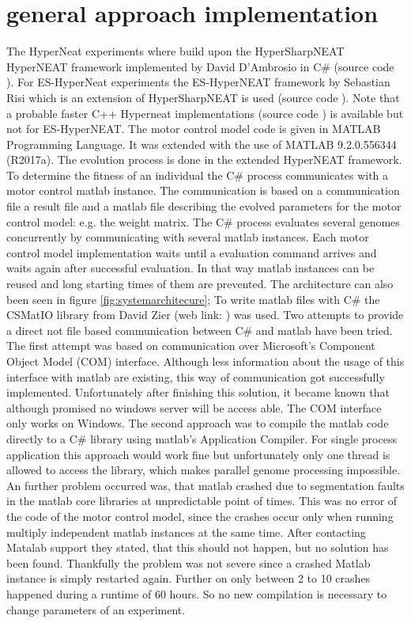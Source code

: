 \section{general approach implementation}
The HyperNeat experiments where build upon the HyperSharpNEAT HyperNEAT framework implemented by David D'Ambrosio in C\# (source code \cite{HyperneatLink}). For ES-HyperNeat experiments the ES-HyperNEAT framework by Sebastian Risi which is an extension of HyperSharpNEAT is used (source code \cite{ES-HyperneatLink}). Note that a probable faster C++ Hyperneat implementations (source code \cite{HyperneatLinkC++}) is available but not for ES-HyperNEAT. The motor control model code is given in MATLAB Programming Language. It was extended with the use of  MATLAB 9.2.0.556344 (R2017a). 
The evolution process is done in the extended HyperNEAT framework. To determine the fitness of an individual the C\# process communicates with a motor control matlab instance.  The communication is based on a communication file a result file and a matlab file describing the evolved parameters for the motor control model: e.g. the weight matrix.  The C\# process evaluates several genomes concurrently by communicating with several matlab instances. Each motor control model implementation waits until a evaluation command arrives and waits again after successful evaluation. In that way matlab instances can be reused and long starting times of them are prevented. The architecture can also been seen in figure \ref{fig:systemarchitecure};
 To write matlab files with C\# the CSMatIO library from David Zier (web link: \cite{csmatioLink}) was used.
Two attempts to provide a direct not file based communication between C\# and matlab have been tried. The first attempt was based on communication over Microsoft's Component Object Model (COM) interface. Although less information about the usage of this interface with matlab are existing, this way of communication got successfully implemented. Unfortunately after finishing this solution, it became known that although promised no windows server will be access able. The COM interface only works on Windows. The second approach was to compile the matlab code directly to a C\# library using matlab's Application Compiler. For single process application this approach would work fine but unfortunately only one thread is allowed to access the library, which makes parallel genome processing impossible. 
An further problem occurred was, that matlab crashed due to segmentation faults in the matlab core libraries at unpredictable point of times. This was no error of the code of the motor control model, since the crashes occur only when running multiply independent matlab instances at the same time. After contacting Matalab support they stated, that this should not happen, but no solution has been found. Thankfully the problem was not severe since a crashed Matlab instance is simply restarted again. Further on only between 2 to 10 crashes happened during a runtime of 60 hours. So no new compilation is necessary to change parameters of an experiment. 
